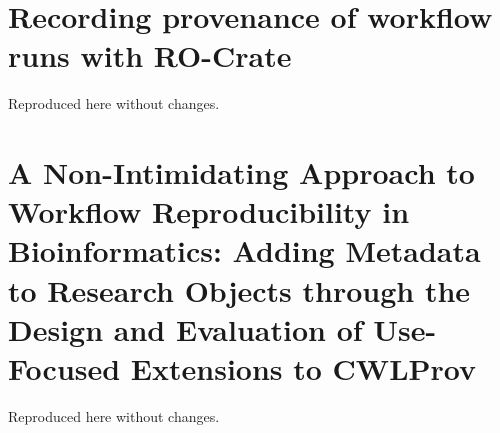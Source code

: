 \documentclass{dissertation}
\begin{document}
\chapter{Recording provenance of workflow runs with RO-Crate}
\label{wrroc}


Reproduced here without changes.


\chapter{A Non-Intimidating Approach to Workflow Reproducibility in Bioinformatics: Adding Metadata to Research Objects through the Design and Evaluation of Use-Focused Extensions to CWLProv}
\label{cwlprov-analysis}
Reproduced here without changes.



\end{document}
